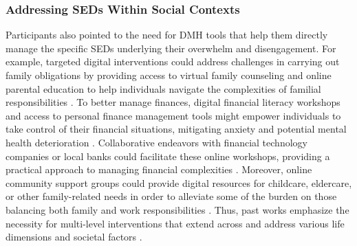 \subsubsection{Addressing SEDs Within Social Contexts}

Participants also pointed to the need for DMH tools that help them directly manage the specific SEDs underlying their overwhelm and disengagement.   For example, targeted digital interventions could address challenges in carrying out family obligations by providing access to virtual family counseling and online parental education to help individuals navigate the complexities of familial responsibilities \cite{chi2015systematic, smout2023enabling}. To better manage finances, digital financial literacy workshops and access to personal finance management tools might empower individuals to take control of their financial situations, mitigating anxiety and potential mental health deterioration \cite{boyd2016earned, mehra2018prayana}. Collaborative endeavors with financial technology companies or local banks could facilitate these online workshops, providing a practical approach to managing financial complexities \cite{dillahunt2022village, moulder2014hci}. Moreover, online community support groups could provide digital resources for childcare, eldercare, or other family-related needs in order to alleviate some of the burden on those balancing both family and work responsibilities \cite{gisore2012community, chaudhry2022formative, butler2012relationship, compton2015social, smout2023enabling}. Thus, past works emphasize the necessity for multi-level interventions that extend across and address various life dimensions and societal factors \cite{xu2023technology, sallis2015ecological, scholmerich2016translating, bauer2022community, murnane2018personal}. 


